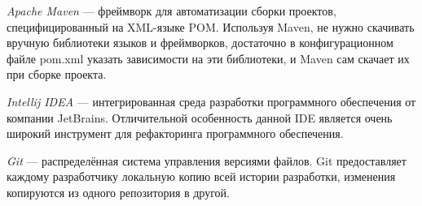\textit{Apache Maven} --- фреймворк для автоматизации сборки проектов,
специфицированный на XML-языке POM. Используя Maven, не нужно скачивать вручную
библиотеки языков и фреймворков, достаточно в конфигурационном файле pom.xml
указать зависимости на эти библиотеки, и Maven сам скачает их при сборке проекта.

\textit{Intellij IDEA} --- интегрированная среда разработки программного обеспечения
от компании JetBrains. Отличительной особенность данной IDE является очень широкий
инструмент для рефакторинга программного обеспечения.

\textit{Git} --- распределённая система управления версиями файлов. Git предоставляет
каждому разработчику локальную копию всей истории разработки, изменения копируются
из одного репозитория в другой.

\pagebreak
